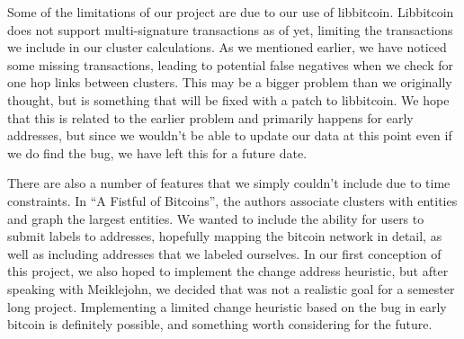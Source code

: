 \documentclass[10pt, letterpaper, twocolumn, twoside]{article}
\begin{document}
Some of the limitations of our project are due to our use of libbitcoin\cite{libbitcoin}. Libbitcoin does not support multi-signature transactions as of yet, limiting the transactions we include in our cluster calculations. As we mentioned earlier, we have noticed some missing transactions, leading to potential false negatives when we check for one hop links between clusters. This may be a bigger problem than we originally thought, but is something that will be fixed with a patch to libbitcoin. We hope that this is related to the earlier problem and primarily happens for early addresses, but since we wouldn't be able to update our data at this point even if we do find the bug, we have left this for a future date. 

There are also a number of features that we simply couldn't include due to time constraints. In ``A Fistful of Bitcoins''\cite{fistfull}, the authors associate clusters with entities and graph the largest entities. We wanted to include the ability for users to submit labels to addresses, hopefully mapping the bitcoin network in detail, as well as including addresses that we labeled ourselves. In our first conception of this project, we also hoped to implement the change address heuristic, but after speaking with Meiklejohn, we decided that was not a realistic goal for a semester long project. Implementing a limited change heuristic based on the bug in early bitcoin is definitely possible, and something worth considering for the future.



\end{document}
